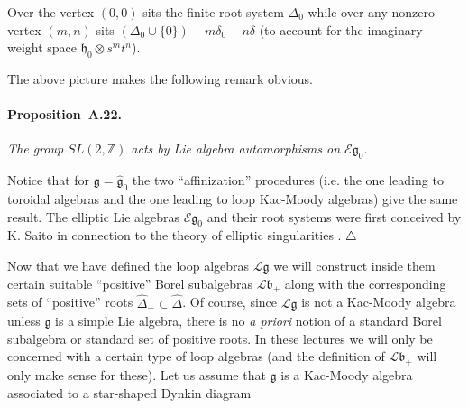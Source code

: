 \documentclass[a4paper,10pt]{amsart}
\def\Z{\mathbb{Z}}
\def\endexample{$\hfill \triangle$}
\def\g{\mathfrak{g}}
\def\bo{\mathfrak{b}}
\def\h{\mathfrak{h}}
\numberwithin{equation}{section}
\begin{document}
{\vspace{.2in}

Over the vertex $(0,0)$ sits the finite root system $\Delta_0$ while over any nonzero vertex $(m,n)$ sits
$(\Delta_0\cup \{0\})+m\delta_0+n\delta$ (to account for the imaginary weight space $\h_0 \otimes s^mt^n$).

The above picture makes the following remark obvious.

\vspace{.1in}

\paragraph{\textbf{Proposition~A.22.}}
\textit{The group $SL(2,\Z)$ acts by Lie algebra automorphisms on $\mathcal{E}{\g_0}$}.

\vspace{.15in}

Notice that for $\g=\widehat{\g}_0$ the two ``affinization'' procedures (i.e. the one leading to toroidal algebras and the one leading to loop Kac-Moody algebras) give the same result. The elliptic Lie algebras $\mathcal{E}{\g_0}$ and their root systems were first conceived by K. Saito in connection to the theory of elliptic singularities \cite{Saito}. \endexample

\vspace{.2in}

Now that we have defined the loop algebras $\mathcal{L}\g$ we will construct inside them certain suitable ``positive'' Borel subalgebras $\mathcal{L}\bo_+$ along with the corresponding sets of ``positive'' roots $\widehat{\Delta}_+ \subset \widehat{\Delta}$. Of course, since $\mathcal{L}\g$ is not a Kac-Moody algebra unless $\g$ is a simple Lie algebra, there is no \textit{a priori} notion of a standard Borel subalgebra or standard set of positive roots.
In these lectures we will only be concerned with a certain type of loop algebras (and the definition of $\mathcal{L}\bo_+$  will only make sense for these). Let us assume that $\g$ is a Kac-Moody algebra associated to a star-shaped Dynkin diagram

\vspace{.3in}

}
\end{document}
